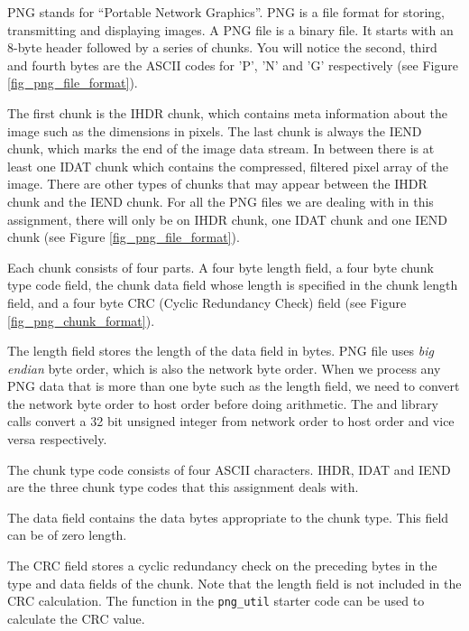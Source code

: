 PNG stands for ``Portable Network Graphics''. PNG is a file format for storing, transmitting and displaying images\cite{Roelofs1999PNG}. A PNG file is a binary file. It starts with an 8-byte header followed by a series of chunks. You will notice the second, third and fourth bytes are the ASCII codes for 'P', 'N' and 'G' respectively (see Figure \ref{fig_png_file_format}).

The first chunk is the IHDR chunk, which contains meta information about the image such as the dimensions in pixels. The last chunk is always the IEND chunk, which marks the end of the image data stream. In between there is at least one IDAT chunk which contains the compressed, filtered pixel array of the image. There are other types of chunks that may appear between the IHDR chunk and the IEND chunk. For all the PNG files we are dealing with in this assignment, there will only be on IHDR chunk, one IDAT chunk and one IEND chunk (see Figure \ref{fig_png_file_format}).


Each chunk consists of four parts. A four byte length field, a four byte chunk type code field, the chunk data field whose length is specified in the chunk length field, and a four byte CRC (Cyclic Redundancy Check) field (see Figure \ref{fig_png_chunk_format}).

The length field stores the length of the data field in bytes. PNG file uses {\em big endian} byte order, which is also the network byte order. When we process any PNG data that is more than one byte such as the length field, we need to convert the network byte order to host order before doing arithmetic. The  and  library calls convert a 32 bit unsigned integer from network order to host order and vice versa respectively.



The chunk type code consists of four ASCII characters. IHDR, IDAT and IEND are the three chunk type codes that this assignment deals with.

The data field contains the data bytes appropriate to the chunk type. This field can be of zero length.

The CRC field stores a cyclic redundancy check on the preceding bytes in the type and data fields of the chunk. Note that the length field is not included in the CRC calculation. The  function in the \verb+png_util+ starter code can be used to calculate the CRC value.

